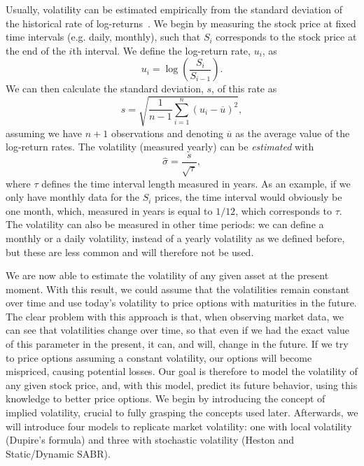 Usually, volatility can be estimated empirically from the standard deviation of the historical rate of log-returns~\citep{Hull}.
We begin by measuring the stock price at fixed time intervals (e.g. daily, monthly), such that $S_i$ corresponds to the stock price at the end of the $i$th interval. We define the log-return rate, $u_i$, as
\begin{equation}
u_i=\log\left(\frac{S_i}{S_{i-1}}\right).
\end{equation}
We can then calculate the standard deviation, $s$, of this rate as
\begin{equation}
s=\sqrt{\frac{1}{n-1}\sum_{i=1}^n(u_i-\overline{u})^2},
\end{equation}
\noindent assuming we have $n+1$ observations and denoting $\overline{u}$ as the average value of the log-return rates.
The volatility (measured yearly) can be \emph{estimated} with
\begin{equation}
\hat{\sigma}=\frac{s}{\sqrt{\tau}},
\end{equation}
\noindent where $\tau$ defines the time interval length measured in years. As an example, if we only have monthly data for the $S_i$ prices, the time interval would obviously be one month, which, measured in years is equal to $1/12$, which corresponds to $\tau$.
The volatility can also be measured in other time periods: we can define a monthly or a daily volatility, instead of a yearly volatility as we defined before, but these are less common and will therefore not be used.

We are now able to estimate the volatility of any given asset at the present moment. With this result, we could assume that the volatilities remain constant over time and use today's volatility to price options with maturities in the future. The clear problem with this approach is that, when observing market data, we can see that volatilities change over time, so that even if we had the exact value of this parameter in the present, it can, and will, change in the future. If we try to price options assuming a constant volatility, our options will become mispriced, causing potential losses.
Our goal is therefore to model the volatility of any given stock price, and, with this model, predict its future behavior, using this knowledge to better price options.
We begin by introducing the concept of implied volatility, crucial to fully grasping the concepts used later. Afterwards, we will introduce four models to replicate market volatility: one with local volatility (Dupire's formula) and three with stochastic volatility (Heston and Static/Dynamic SABR).

